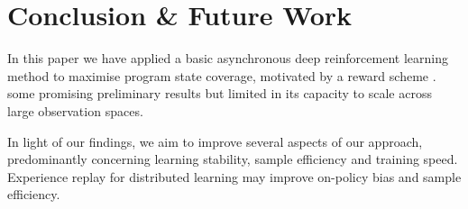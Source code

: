 \documentclass[conference,compsoc]{IEEEtran}
\begin{document}
%




\section{Conclusion \& Future Work }
In this paper we have applied a basic asynchronous deep reinforcement learning method to maximise program state coverage, motivated by a reward scheme . some promising preliminary results but limited in its capacity to scale across large observation spaces. 

In light of our findings, we aim to improve several aspects of our approach, predominantly concerning learning stability, sample efficiency and training speed. Experience replay for distributed learning may improve on-policy bias and sample efficiency. 
\end{document}
